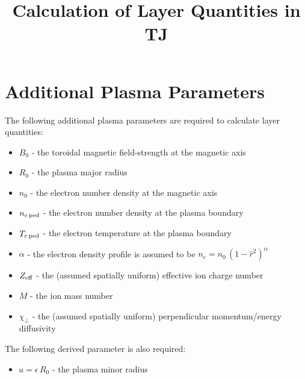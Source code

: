 \documentclass[12pt,prb,aps,notitlepage]{revtex4-1}
\begin{document}
\title{Calculation of Layer Quantities in TJ}
\maketitle

\section{Additional Plasma Parameters}
The following additional plasma parameters are required to calculate layer quantities:
\begin{itemize}
\item $B_0$ - the toroidal magnetic field-strength at the magnetic axis
\item $R_0$ - the plasma major radius
\item $n_0$ - the  electron number density at the magnetic axis
\item $n_{e\,{\rm ped}}$ - the  electron number density at the plasma boundary
\item $T_{e\,{\rm ped}}$ - the  electron temperature at the plasma boundary
\item $\alpha$ - the electron density profile is assumed to be $n_e=n_0\,(1-\hat{r}^2)^\alpha$
\item $Z_{\rm eff}$  - the (assumed spatially uniform) effective ion charge number
\item $M$ - the ion mass number
\item $\chi_\perp$ - the (assumed spatially uniform) perpendicular momentum/energy diffusivity
\end{itemize}
The following derived parameter is also required:
\begin{itemize}
\item $a=\epsilon\,R_0$ - the plasma minor radius
\end{itemize}
\end{document}
